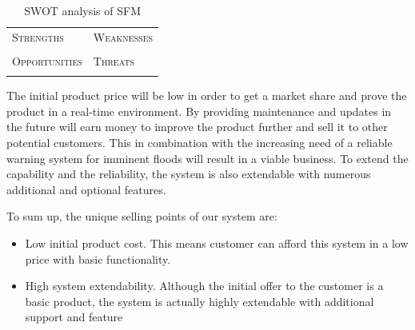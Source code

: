 
\begin{table}[H]
	\centering
	\begin{tabular}{L{} | L{}}
		\toprule
		\textsc{\Large Strengths}     & \textsc{\Large Weaknesses} \\
		 \Strengths      &  \Weaknesses  \\
		\midrule
		\textsc{\Large Opportunities} & \textsc{\Large Threats}    \\
		 \Opportunities  &  \Threats     \\
	\end{tabular}
	\caption{SWOT analysis of SFM}
	\label{table:swot}
\end{table}

The initial product price will be low in order to get a market share and prove the product in a real-time environment. By providing maintenance and updates in the future \CompanyName{} will earn money to improve the product further and sell it to other potential customers. This in combination with the increasing need of a reliable warning system for imminent floods will result in a viable business. To extend the capability and the reliability, the system is also extendable with numerous additional and optional features.

To sum up, the unique selling points of our system are: 
\begin{itemize}
	\item Low initial product cost. This means customer can afford this system in a low price with basic functionality.
	\item High system extendability. Although the initial offer to the customer is a basic product, the system is actually highly extendable with additional support and feature
\end{itemize}

